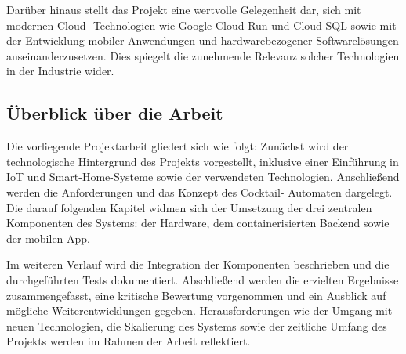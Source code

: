 Darüber hinaus stellt das Projekt eine wertvolle Gelegenheit dar, sich mit modernen Cloud-
Technologien wie Google Cloud Run und Cloud SQL sowie mit der Entwicklung mobiler Anwendungen und 
hardwarebezogener Softwarelösungen auseinanderzusetzen. Dies spiegelt die zunehmende Relevanz 
solcher Technologien in der Industrie wider.

\subsection{Überblick über die Arbeit}
Die vorliegende Projektarbeit gliedert sich wie folgt: Zunächst wird der technologische Hintergrund 
des Projekts vorgestellt, inklusive einer Einführung in IoT und Smart-Home-Systeme sowie der 
verwendeten Technologien. Anschließend werden die Anforderungen und das Konzept des Cocktail-
Automaten dargelegt. Die darauf folgenden Kapitel widmen sich der Umsetzung der drei zentralen 
Komponenten des Systems: der Hardware, dem containerisierten Backend sowie der mobilen App. 

Im weiteren Verlauf wird die Integration der Komponenten beschrieben und die durchgeführten Tests 
dokumentiert. Abschließend werden die erzielten Ergebnisse zusammengefasst, eine kritische Bewertung
 vorgenommen und ein Ausblick auf mögliche Weiterentwicklungen gegeben. Herausforderungen wie der 
 Umgang mit neuen Technologien, die Skalierung des Systems sowie der zeitliche Umfang des Projekts 
 werden im Rahmen der Arbeit reflektiert.

